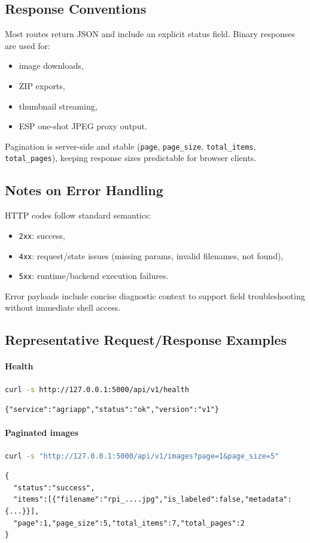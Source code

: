 \subsection{Response Conventions}
Most routes return JSON and include an explicit status field. Binary responses are used for:
\begin{itemize}
  \item image downloads,
  \item ZIP exports,
  \item thumbnail streaming,
  \item ESP one-shot JPEG proxy output.
\end{itemize}

Pagination is server-side and stable (\texttt{page}, \texttt{page\_size}, \texttt{total\_items}, \texttt{total\_pages}), keeping response sizes predictable for browser clients.

\subsection{Notes on Error Handling}
HTTP codes follow standard semantics:
\begin{itemize}
  \item \texttt{2xx}: success,
  \item \texttt{4xx}: request/state issues (missing params, invalid filenames, not found),
  \item \texttt{5xx}: runtime/backend execution failures.
\end{itemize}

Error payloads include concise diagnostic context to support field troubleshooting without immediate shell access.

\subsection{Representative Request/Response Examples}
\paragraph{Health}
\begin{lstlisting}[language=bash]
curl -s http://127.0.0.1:5000/api/v1/health
\end{lstlisting}
\begin{lstlisting}
{"service":"agriapp","status":"ok","version":"v1"}
\end{lstlisting}

\paragraph{Paginated images}
\begin{lstlisting}[language=bash]
curl -s "http://127.0.0.1:5000/api/v1/images?page=1&page_size=5"
\end{lstlisting}
\begin{lstlisting}
{
  "status":"success",
  "items":[{"filename":"rpi_....jpg","is_labeled":false,"metadata":{...}}],
  "page":1,"page_size":5,"total_items":7,"total_pages":2
}
\end{lstlisting}

